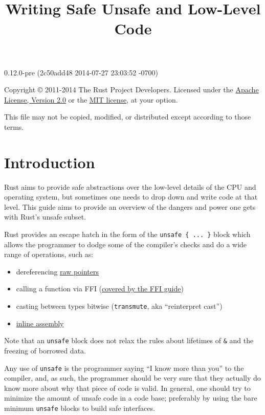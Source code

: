 \documentclass[]{article}
\title{Writing Safe Unsafe and Low-Level Code}
\begin{document}
\maketitle

0.12.0-pre (2c50add48 2014-07-27 23:03:52 -0700)

Copyright © 2011-2014 The Rust Project Developers. Licensed under the
\href{http://www.apache.org/licenses/LICENSE-2.0}{Apache License,
Version 2.0} or the \href{http://opensource.org/licenses/MIT}{MIT
license}, at your option.

This file may not be copied, modified, or distributed except according
to those terms.

{
\hypersetup{linkcolor=black}
\setcounter{tocdepth}{3}
\tableofcontents
}
\section{Introduction}\label{introduction}

Rust aims to provide safe abstractions over the low-level details of the
CPU and operating system, but sometimes one needs to drop down and write
code at that level. This guide aims to provide an overview of the
dangers and power one gets with Rust's unsafe subset.

Rust provides an escape hatch in the form of the
\texttt{unsafe \{ ... \}} block which allows the programmer to dodge
some of the compiler's checks and do a wide range of operations, such
as:

\begin{itemize}
\itemsep1pt\parskip0pt
\item
  dereferencing \hyperref[raw-pointers]{raw pointers}
\item
  calling a function via FFI (\href{guide-ffi.html}{covered by the FFI
  guide})
\item
  casting between types bitwise (\texttt{transmute}, aka ``reinterpret
  cast'')
\item
  \hyperref[inline-assembly]{inline assembly}
\end{itemize}

Note that an \texttt{unsafe} block does not relax the rules about
lifetimes of \texttt{\&} and the freezing of borrowed data.

Any use of \texttt{unsafe} is the programmer saying ``I know more than
you'' to the compiler, and, as such, the programmer should be very sure
that they actually do know more about why that piece of code is valid.
In general, one should try to minimize the amount of unsafe code in a
code base; preferably by using the bare minimum \texttt{unsafe} blocks
to build safe interfaces.
\end{document}
